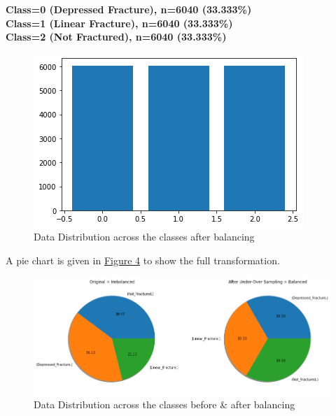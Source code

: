 \documentclass[sigconf]{acmart}
\begin{document}
\textbf{Class=0 (Depressed Fracture), n=6040 (33.333\%)}\\
\textbf{Class=1 (Linear Fracture), n=6040 (33.333\%)}\\
\textbf{Class=2 (Not Fractured), n=6040 (33.333\%)}\\
\begin{figure}[h]
  \centering
   
  \includegraphics[width=\linewidth]{../supplements/2.Data After Balancing.png}
 
\caption{Data Distribution across the classes after balancing
}
  \label{Fig.3}
\end{figure}
A pie chart is given in \hyperref[Fig.4]{Figure 4} to show the full transformation.

\begin{figure}[h]
  \centering
   
  \includegraphics[width=\linewidth]{../supplements/3.Before and After.png}
 
\caption{Data Distribution across the classes before \& after balancing}
  \label{Fig.4}
\end{figure}
\end{document}
